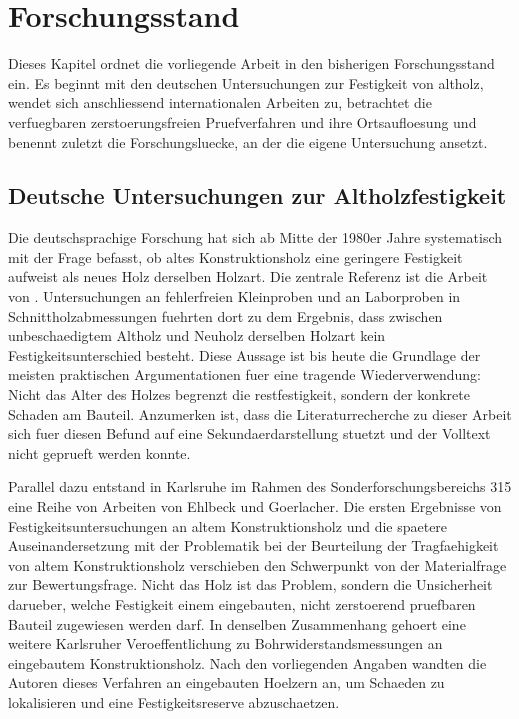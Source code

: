 \chapter{Forschungsstand}
\label{ch:literature}

Dieses Kapitel ordnet die vorliegende Arbeit in den bisherigen Forschungsstand
ein. Es beginnt mit den deutschen Untersuchungen zur Festigkeit von
\gls{altholz}, wendet sich anschliessend internationalen Arbeiten zu,
betrachtet die verfuegbaren zerstoerungsfreien Pruefverfahren und ihre
Ortsaufloesung und benennt zuletzt die Forschungsluecke, an der die eigene
Untersuchung ansetzt.

\section{Deutsche Untersuchungen zur Altholzfestigkeit}
\label{sec:lit-deutsch}

Die deutschsprachige Forschung hat sich ab Mitte der 1980er Jahre systematisch
mit der Frage befasst, ob altes Konstruktionsholz eine geringere Festigkeit
aufweist als neues Holz derselben Holzart. Die zentrale Referenz ist die Arbeit
von \textcite{rug1989}. Untersuchungen an fehlerfreien Kleinproben und an
Laborproben in Schnittholzabmessungen fuehrten dort zu dem Ergebnis, dass
zwischen unbeschaedigtem Altholz und Neuholz derselben Holzart kein
Festigkeitsunterschied besteht. Diese Aussage ist bis heute die Grundlage der
meisten praktischen Argumentationen fuer eine tragende Wiederverwendung: Nicht
das Alter des Holzes begrenzt die \gls{restfestigkeit}, sondern der konkrete
Schaden am Bauteil. Anzumerken ist, dass die Literaturrecherche zu dieser
Arbeit sich fuer diesen Befund auf eine Sekundaerdarstellung stuetzt und der
Volltext nicht geprueft werden konnte.

Parallel dazu entstand in Karlsruhe im Rahmen des Sonderforschungsbereichs 315
eine Reihe von Arbeiten von Ehlbeck und Goerlacher. Die ersten Ergebnisse von
Festigkeitsuntersuchungen an altem Konstruktionsholz \parencite{ehlbeck1988}
und die spaetere Auseinandersetzung mit der Problematik bei der Beurteilung der
Tragfaehigkeit von altem Konstruktionsholz \parencite{ehlbeck1990} verschieben
den Schwerpunkt von der Materialfrage zur Bewertungsfrage. Nicht das Holz ist
das Problem, sondern die Unsicherheit darueber, welche Festigkeit einem
eingebauten, nicht zerstoerend pruefbaren Bauteil zugewiesen werden darf. In
denselben Zusammenhang gehoert eine weitere Karlsruher Veroeffentlichung zu
Bohrwiderstandsmessungen an eingebautem Konstruktionsholz. Nach den
vorliegenden Angaben wandten die Autoren dieses Verfahren an eingebauten
Hoelzern an, um Schaeden zu lokalisieren und eine Festigkeitsreserve
abzuschaetzen.

